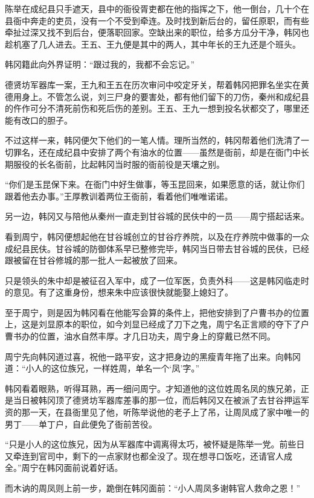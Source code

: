 陈举在成纪县只手遮天，县中的衙役胥吏都在他的指挥之下，他一倒台，几十个在县衙中奔走的吏员，没有一个不受到牵连。及时找到新后台的，留任原职，而有些牵扯过深又找不到后台，便落职回家。空缺出来的职位，给多方瓜分干净，韩冈也趁机塞了几人进去。王五、王九便是其中的两人，其中年长的王九还是个班头。

韩冈籍此向外界证明：“跟过我的，我都不会忘记。”

德贤坊军器库一案，王九和王五在历次审问中咬定牙关，帮着韩冈把罪名坐实在黄德用身上。不管怎么说，刘三尸身的要害处，都有他们留下的刀伤，秦州和成纪县的仵作可分不清死前伤和死后伤的差别。王五、王九一想到投名状都交了，哪里还能有改口的胆子。

不过这样一来，韩冈便欠下他们的一笔人情。理所当然的，韩冈帮着他们洗清了一切罪名，还在成纪县中安排了两个有油水的位置——虽然是衙前，却是在衙门中长期服役的长名衙前，比起韩冈当时服的衙前役是天壤之别。

“你们是玉昆保下来。在衙门中好生做事，等玉昆回来，如果愿意的话，就让你们跟着他去办事。”王厚教训着两位王衙前，看着他们唯唯诺诺。

另一边，韩冈又与陪他从秦州一直走到甘谷城的民伕中的一员——周宁搭起话来。

看到周宁，韩冈便想起他在甘谷城创立的甘谷疗养院，以及在疗养院中做事的一众成纪县民伕。甘谷城的防御体系早已整修完毕，韩冈当日带去甘谷城的民伕，已经跟被留在甘谷修城的那一批人一起被放了回来。

只是领头的朱中却是被征召入军中，成了一位军医，负责外科——这是韩冈临走时的意见。有了这重身份，想来朱中应该很快就能娶上媳妇了。

至于周宁，则是因为韩冈看在他能写会算的条件上，把他安排到了户曹书办的位置上，这是刘显原本的职位，如今刘显已经成了刀下之鬼，周宁名正言顺的夺下了户曹书办的位置，油水自然丰厚。才几日功夫，周宁身上的穿戴已然不同。

周宁先向韩冈道过喜，祝他一路平安，这才把身边的黑瘦青年拖了出来。向韩冈道：“小人的这位族兄，一样姓周，单名一个‘凤’字。”

韩冈看着眼熟，听得耳熟，再一细问周宁。才知道他的这位姓周名凤的族兄弟，正是当日被韩冈顶了德贤坊军器库差事的那一位，而后韩冈又在被派了去甘谷押运军资的那一天，在县衙里见了他，听陈举说他的老子上了吊，让周凤成了家中唯一的男丁——单丁户，自此便免了衙前苦役。

“只是小人的这位族兄，因为从军器库中调离得太巧，被怀疑是陈举一党。前些日又牵连到官司中，剩下的一点家财也都全没了。现在想寻口饭吃，还请官人成全。”周宁在韩冈面前说着好话。

而木讷的周凤则上前一步，跪倒在韩冈面前：“小人周凤多谢韩官人救命之恩！”

